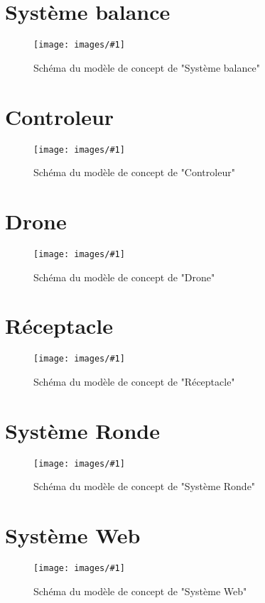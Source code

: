 

\newcommand{\InputCM}[2]{
    \section{#2}

    \begin{figure}[H]
        \centering
        \texttt{[image: images/\#1]}
        \caption{Schéma du modèle de concept de "#2"}
    \end{figure}
}




\InputCM{balance}{Système balance}
\InputCM{controleur}{Controleur}
\InputCM{drone}{Drone}
\InputCM{receptacle}{Réceptacle}
\InputCM{ronde}{Système Ronde}
\InputCM{web}{Système Web}


